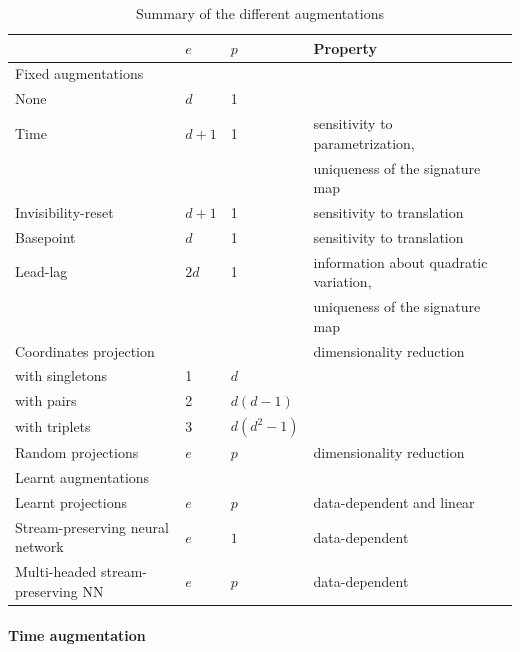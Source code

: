 \documentclass{article}
\theoremstyle{definition}
\theoremstyle{remark}
\newcommand{\reals}{\mathbb{R}}
\newcommand{\tseries}[1]{\mathcal{S}(#1)}
\begin{document}
		\begin{table}[h]
	\centering
	\caption{Summary of the different augmentations}
	\label{tab:summary_augmentations}
	\begin{tabular}{llll l}
	\toprule
	 & $e$ & $p$ & Property  \\
	\midrule
	\multicolumn{4}{l}{Fixed augmentations} \\
	\cmidrule(r){1-1}
	None                                & $d$   & 1     &      \\
	Time                                & $d+1$ & 1     & sensitivity to parametrization, \\
										&		&		& uniqueness of the signature map \\
	Invisibility-reset                  & $d+1$ & 1     & sensitivity to translation  \\
	Basepoint                           & $d$   & 1     & sensitivity to translation  \\
	Lead-lag   	                        & $2d$  & 1     & information about quadratic variation, \\
										&		&		& uniqueness of the signature map \\
	Coordinates projection &     &   & dimensionality reduction \\
	\qquad with singletons & 1 & $d$ & \\
	\qquad with pairs  & 2     & $d(d-1)$ &  \\
	\qquad with triplets  & 3     & $d(d^2-1)$&\\
	Random projections                  & $e$   & $p$     & dimensionality reduction \\
	\cmidrule(r){1-1}
	\multicolumn{4}{l}{Learnt augmentations} \\
	\cmidrule(r){1-1}
	Learnt projections 	& $e$	& $p$		& data-dependent and linear \\
	Stream-preserving neural network & $e$ & $1$ & data-dependent \\
	Multi-headed stream-preserving NN      & $e$   & $p$   &  data-dependent  \\
	\bottomrule
	\end{tabular}
	\end{table}

	\paragraph{Time augmentation}
	
\end{document}

